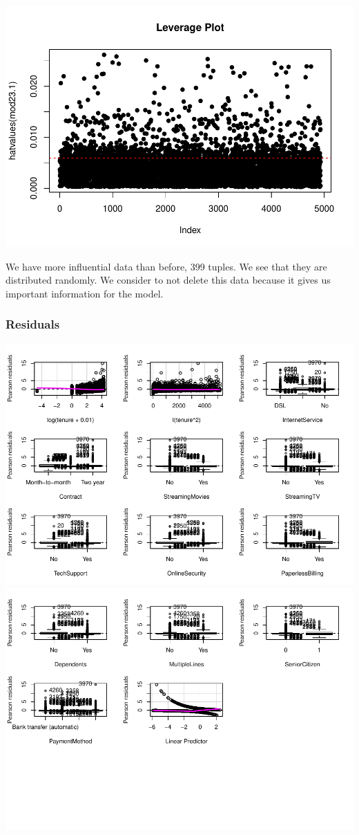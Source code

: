\documentclass[
  twoside]{article}
\begin{document}
\includegraphics{Assigment2_files/figure-latex/unnamed-chunk-77-1.pdf}

We have more influential data than before, 399 tuples. We see that they
are distributed randomly. We consider to not delete this data because it
gives us important information for the model.

\hypertarget{residuals-1}{%
\subsubsection{Residuals}\label{residuals-1}}

\includegraphics{Assigment2_files/figure-latex/unnamed-chunk-78-1.pdf}
\includegraphics{Assigment2_files/figure-latex/unnamed-chunk-78-2.pdf}
\end{document}
